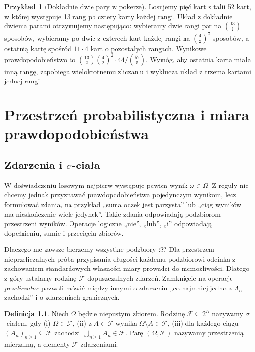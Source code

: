 \documentclass[11pt,a4paper,oneside]{report}
\numberwithin{equation}{chapter}
\theoremstyle{plain}
\theoremstyle{definition}
\newtheorem{definicja}{Definicja}[chapter]
\newtheorem{przyklad}{Przykład}[chapter]
\theoremstyle{remark}
\begin{document}
\begin{przyklad}[Dokładnie dwie pary w pokerze]
Losujemy pięć kart z talii 52 kart, w której występuje 13 rang
po cztery karty każdej rangi. Układ z dokładnie dwiema parami
otrzymujemy następująco: wybieramy dwie rangi par na $\binom{13}2$
sposobów, wybieramy po dwie z czterech kart każdej rangi
na $\binom42^2$ sposobów, a ostatnią kartę spośród
$11\cdot4$ kart o pozostałych rangach. Wynikowe
prawdopodobieństwo to
$\binom{13}2\binom42^2\cdot44/\binom{52}5$.
Wymóg, aby ostatnia karta miała inną rangę, zapobiega
wielokrotnemu zliczaniu i wyklucza układ z trzema
kartami jednej rangi.
\end{przyklad}

\chapter{Przestrzeń probabilistyczna i miara prawdopodobieństwa}
\label{ch:probability}

\section{Zdarzenia i \texorpdfstring{$\sigma$}{sigma}-ciała}
W doświadczeniu losowym najpierw występuje pewien wynik
$\omega\in\Omega$. Z reguły nie chcemy jednak przyznawać
prawdopodobieństwa pojedynczym wynikom, lecz formułować zdania,
na przykład „suma oczek jest parzysta” lub „ciąg wyników ma
nieskończenie wiele jedynek”. Takie zdania odpowiadają podzbiorom
przestrzeni wyników. Operacje logiczne „nie”, „lub”, „i” odpowiadają
dopełnieniu, sumie i przecięciu zbiorów.

Dlaczego nie zawsze bierzemy wszystkie podzbiory $\Omega$?
Dla przestrzeni nieprzeliczalnych próba przypisania długości
każdemu podzbiorowi odcinka z zachowaniem standardowych
własności miary prowadzi do niemożliwości. Dlatego z góry
ustalamy rodzinę $\mathcal F$ dopuszczalnych zdarzeń.
Zamknięcie na operacje \emph{przeliczalne} pozwoli mówić
między innymi o zdarzeniu „co najmniej jedno z $A_n$ zachodzi”
i o zdarzeniach granicznych.

\begin{definicja}
Niech $\Omega$ będzie niepustym zbiorem. Rodzinę $\mathcal F\subseteq2^\Omega$
nazywamy $\sigma$-ciałem, gdy (i) $\Omega\in\mathcal F$,
(ii) z $A\in\mathcal F$ wynika $\Omega\setminus A\in\mathcal F$,
(iii) dla każdego ciągu $(A_n)_{n\geq1}\subseteq\mathcal F$ zachodzi
$\bigcup_{n\geq1}A_n\in\mathcal F$.
Parę $(\Omega,\mathcal F)$ nazywamy przestrzenią mierzalną,
a elementy $\mathcal F$ zdarzeniami.
\end{definicja}
\end{document}

